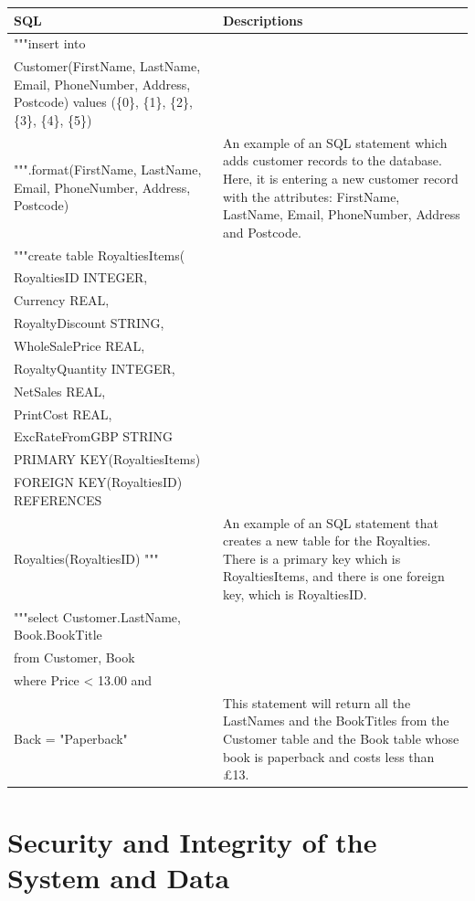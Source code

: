 \begin{tabular}{|p{10cm}|p{5cm}|}
    \hline
    \textbf{SQL} & \textbf{Descriptions} \\ \hline 
     """insert into \\ Customer(FirstName, LastName, Email, PhoneNumber, Address, Postcode) values (\{0\}, \{1\}, \{2\}, \{3\}, \{4\}, \{5\}) \\ """.format(FirstName, LastName, Email, PhoneNumber, Address, Postcode) & An example of an SQL statement which adds customer records to the database. Here, it is entering a new customer record with the attributes: FirstName, LastName, Email, PhoneNumber, Address and Postcode. \\ \hline
    """create table RoyaltiesItems(\\ RoyaltiesID INTEGER, \\ Currency REAL, \\ RoyaltyDiscount STRING,\\  WholeSalePrice REAL,\\ RoyaltyQuantity INTEGER,\\ NetSales REAL,\\ PrintCost REAL, \\ ExcRateFromGBP STRING \\ PRIMARY KEY(RoyaltiesItems) \\ FOREIGN KEY(RoyaltiesID) REFERENCES \\ Royalties(RoyaltiesID) """ & An example of an SQL statement that creates a new table for the Royalties. There is a primary key which is RoyaltiesItems, and there is one foreign key, which is RoyaltiesID. \\ \hline 
    """select Customer.LastName, Book.BookTitle \\ from Customer, Book \\ where Price < 13.00 and \\ Back = "Paperback"  & This statement will return all the LastNames and the BookTitles from the Customer table and the Book table whose book is paperback and costs less than £13. \\ \hline
\end{tabular}

\section{Security and Integrity of the System and Data}

